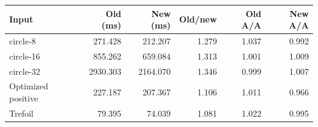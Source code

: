 \begin{tabular}{lrrrrr}
\toprule
Input & Old (ms) & New (ms) & Old/new & Old A/A & New A/A \\
\midrule
circle-8 & 271.428 & 212.207 & 1.279 & 1.037 & 0.992 \\
circle-16 & 855.262 & 659.084 & 1.313 & 1.001 & 1.009 \\
circle-32 & 2930.303 & 2164.070 & 1.346 & 0.999 & 1.007 \\
Optimized positive & 227.187 & 207.367 & 1.106 & 1.011 & 0.966 \\
Trefoil & 79.395 & 74.039 & 1.081 & 1.022 & 0.995 \\
\bottomrule
\end{tabular}
